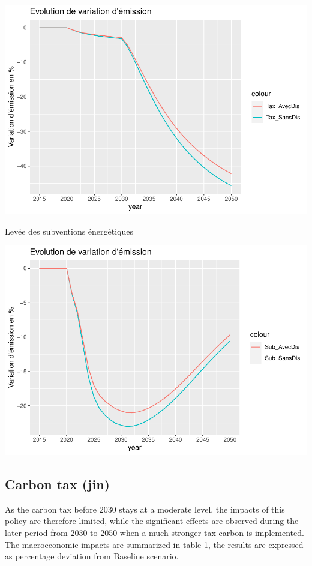 \documentclass[
]{article}
\begin{document}
\includegraphics{Modele-ThreeMe-Tunisie_Sequeira_Valilou_Wang_files/figure-latex/unnamed-chunk-13-1.pdf}

Levée des subventions énergétiques

\includegraphics{Modele-ThreeMe-Tunisie_Sequeira_Valilou_Wang_files/figure-latex/unnamed-chunk-14-1.pdf}

\hypertarget{carbon-tax-jin-1}{%
\subsection{Carbon tax (jin)}\label{carbon-tax-jin-1}}

As the carbon tax before 2030 stays at a moderate level, the impacts of
this policy are therefore limited, while the significant effects are
observed during the later period from 2030 to 2050 when a much stronger
tax carbon is implemented. The macroeconomic impacts are summarized in
table 1, the results are expressed as percentage deviation from Baseline
scenario.
\end{document}
